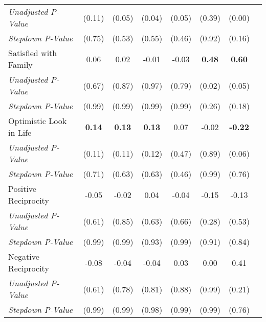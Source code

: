 \begin{tabular}{l c c c c c c c}
\quad \textit{Unadjusted P-Value} & (0.11) & (0.05) & (0.04) & (0.05) & (0.39) & (0.00) \\
\quad \textit{Stepdown P-Value} & (0.75) & (0.53) & (0.55) & (0.46) & (0.92) & (0.16) \\
Satisfied with Family & 0.06 & 0.02 & -0.01 & -0.03 & \textbf{ 0.48 } & \textbf{ 0.60 } \\
\quad \textit{Unadjusted P-Value} & (0.67) & (0.87) & (0.97) & (0.79) & (0.02) & (0.05) \\
\quad \textit{Stepdown P-Value} & (0.99) & (0.99) & (0.99) & (0.99) & (0.26) & (0.18) \\
Optimistic Look in Life & \textbf{ 0.14 } & \textbf{ 0.13 } & \textbf{ 0.13 } & 0.07 & -0.02 & \textbf{ -0.22 } \\
\quad \textit{Unadjusted P-Value} & (0.11) & (0.11) & (0.12) & (0.47) & (0.89) & (0.06) \\
\quad \textit{Stepdown P-Value} & (0.71) & (0.63) & (0.63) & (0.46) & (0.99) & (0.76) \\
Positive Reciprocity & -0.05 & -0.02 & 0.04 & -0.04 & -0.15 & -0.13 \\
\quad \textit{Unadjusted P-Value} & (0.61) & (0.85) & (0.63) & (0.66) & (0.28) & (0.53) \\
\quad \textit{Stepdown P-Value} & (0.99) & (0.99) & (0.93) & (0.99) & (0.91) & (0.84) \\
Negative Reciprocity & -0.08 & -0.04 & -0.04 & 0.03 & 0.00 & 0.41 \\
\quad \textit{Unadjusted P-Value} & (0.61) & (0.78) & (0.81) & (0.88) & (0.99) & (0.21) \\
\quad \textit{Stepdown P-Value} & (0.99) & (0.99) & (0.98) & (0.99) & (0.99) & (0.76) \\
\bottomrule
\end{tabular}
